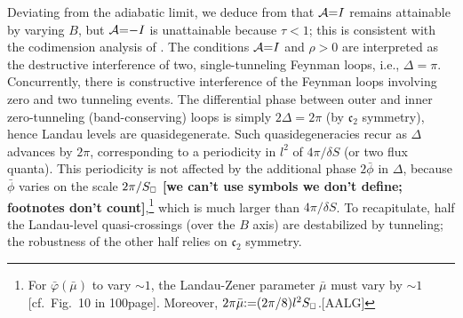 \documentclass[aps, prb, showpacs, twocolumn, notitlepage, superscriptaddress]{revtex4-1}
\begin{document}
Deviating from the adiabatic limit, we deduce from  that  ${\cal A}{=}I$ remains attainable by varying $B$, but ${\cal A}{=}{-}I$ is unattainable because $\tau{<}1$; this is consistent with the codimension analysis of . The conditions ${\cal A}{=}I$ and $\rho{>}0$ are interpreted as the destructive interference of  two, single-tunneling Feynman loops, i.e., $\Delta{=}\pi$. Concurrently, there is constructive interference of the Feynman loops involving zero and two tunneling events. The differential phase between outer and inner zero-tunneling (band-conserving) loops is simply $2\Delta{=}2\pi$ (by $\mathfrak{c}_2$ symmetry), hence Landau levels are quasidegenerate. Such quasidegeneracies recur as $\Delta$ advances by $2\pi$, corresponding to a periodicity in $l^2$ of $4\pi/\delta S$ (or two flux quanta). This periodicity is not affected by the additional phase $2\bar{\phi}$ in $\Delta$, because $\bar{\phi}$  varies on the scale  $2\pi/S_{\scriptscriptstyle{\square}}$ \textbf{[we can't use symbols we don't define; footnotes don't count]},\footnote{For $\bar{\varphi}(\bar{\mu})$ to vary  $\sim 1$, the Landau-Zener parameter $\bar{\mu}$ must vary by $\sim 1$ [cf.\  Fig.\ 10 in 100page]. Moreover, $2\pi\bar{\mu}{:}{=} (2\pi/8) l^2S_{\scriptscriptstyle{\square}}$.[AALG]} which is much larger than
 $4\pi/\delta S$. To recapitulate, half the Landau-level quasi-crossings (over the $B$ axis) are destabilized by tunneling; the robustness of the other half relies on $\mathfrak{c}_2$ symmetry.








\end{document}
